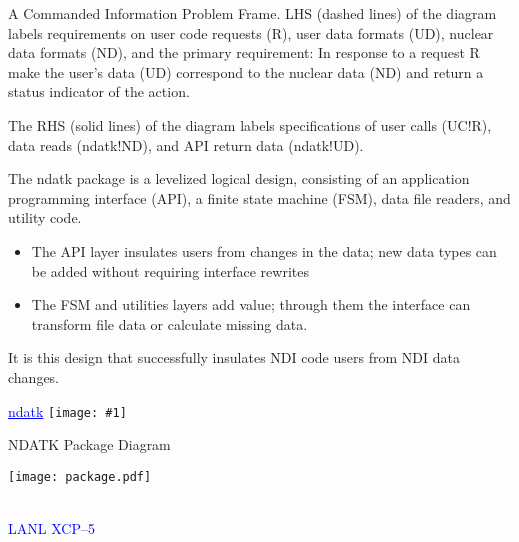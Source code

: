 \documentclass[clock]{slides}
\newenvironment{xslide}[1][logo.jpg]{\begin{slide} \tiny
\textcolor{blue}{\underline{ndatk}} \hfill
\texttt{[image: \#1]}
\normalsize}{\vfill\tiny
\textcolor{blue}{\hrulefill \\LANL XCP--5}
\end{slide}}
\begin{document}
\begin{note}\small
A Commanded Information Problem Frame.  LHS (dashed lines) of the
diagram labels requirements on user code requests (R), user data
formats (UD), nuclear data formats (ND), and the primary requirement:
In response to a request R make the user's data (UD) correspond to the
nuclear data (ND) and return a status indicator of the action.

The RHS (solid lines) of the diagram labels specifications of user
calls (UC!R), data reads (ndatk!ND), and API return data (ndatk!UD).

The ndatk package is a levelized logical design, consisting of an
application programming interface (API), a finite state machine (FSM),
data file readers, and utility code.
\begin{itemize}
\item The API layer insulates users from changes in the data; new data
  types can be added without requiring interface rewrites
\item The FSM and utilities layers add value; through them the interface
  can transform file data or calculate missing data.
\end{itemize}
It is this design that successfully insulates NDI code users from NDI
data changes.
\end{note}

\begin{xslide}
\begin{center}\Large
NDATK Package Diagram
\end{center}
\begin{center}
\texttt{[image: package.pdf]}
\end{center}
\end{xslide}
\end{document}
